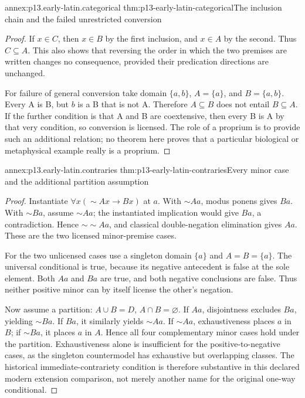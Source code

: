 \begin{annexitem}{annex:p13.early-latin.categorical}
 {thm:p13-early-latin-categorical}{The inclusion chain and the failed unrestricted conversion}
\begin{proof}
If \(x\in C\), then \(x\in B\) by the first inclusion, and
\(x\in A\) by the second. Thus \(C\subseteq A\).
This also shows that reversing the order in which the two premises
are written changes no consequence, provided their predication
directions are unchanged.

For failure of general conversion take domain \(\{a,b\}\),
\(A=\{a\}\), and \(B=\{a,b\}\).
Every A is B, but \(b\) is a B that is not A.
Therefore \(A\subseteq B\) does not entail \(B\subseteq A\).
If the further condition is that A and B are coextensive,
then every B is A by that very condition, so conversion is licensed.
The role of a proprium is to provide such an additional relation;
no theorem here proves that a particular biological or metaphysical
example really is a proprium.
\end{proof}
\end{annexitem}

\begin{annexitem}{annex:p13.early-latin.contraries}
 {thm:p13-early-latin-contraries}{Every minor case and the additional partition assumption}
\begin{proof}
Instantiate \(\forall x(\sim Ax\to Bx)\) at \(a\).
With \(\sim Aa\), modus ponens gives \(Ba\).
With \(\sim Ba\), assume \(\sim Aa\); the instantiated implication
would give \(Ba\), a contradiction. Hence \(\sim\sim Aa\), and
classical double-negation elimination gives \(Aa\).
These are the two licensed minor-premise cases.

For the two unlicensed cases use a singleton domain \(\{a\}\) and
\(A=B=\{a\}\). The universal conditional is true, because its negative
antecedent is false at the sole element.
Both \(Aa\) and \(Ba\) are true, and both negative conclusions are false.
Thus neither positive minor can by itself license the other's negation.

Now assume a partition: \(A\cup B=D\), \(A\cap B=\varnothing\).
If \(Aa\), disjointness excludes \(Ba\), yielding \(\sim Ba\).
If \(Ba\), it similarly yields \(\sim Aa\).
If \(\sim Aa\), exhaustiveness places \(a\) in \(B\); if \(\sim Ba\),
it places \(a\) in \(A\).
Hence all four complementary minor cases hold under the partition.
Exhaustiveness alone is insufficient for the positive-to-negative cases,
as the singleton countermodel has exhaustive but overlapping classes.
The historical immediate-contrariety condition is therefore substantive
in this declared modern extension comparison, not merely another name
for the original one-way conditional.
\end{proof}
\end{annexitem}

